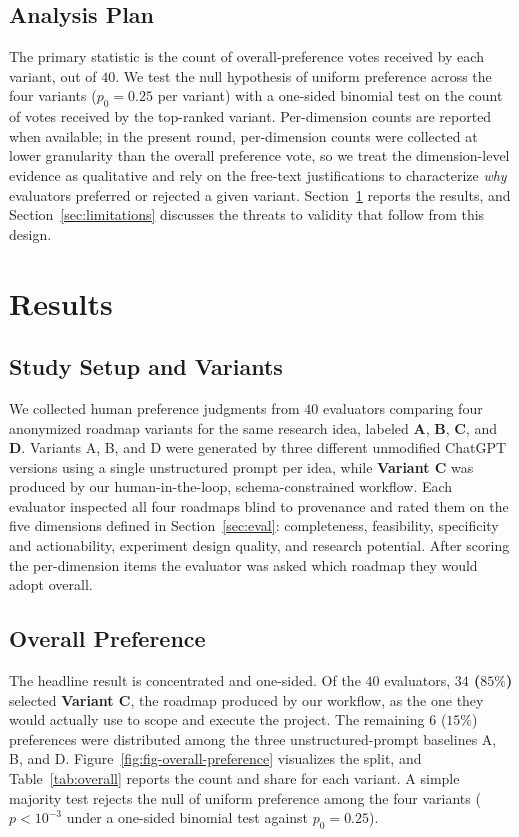 \documentclass{article}
\begin{document}
\subsection{Analysis Plan}
\label{sec:eval:analysis}

The primary statistic is the count of overall-preference votes received
by each variant, out of $40$. We test the null hypothesis of uniform
preference across the four variants ($p_0 = 0.25$ per variant) with a
one-sided binomial test on the count of votes received by the
top-ranked variant. Per-dimension counts are reported when available;
in the present round, per-dimension counts were collected at lower
granularity than the overall preference vote, so we treat the
dimension-level evidence as qualitative and rely on the free-text
justifications to characterize \emph{why} evaluators preferred or
rejected a given variant. Section~\ref{sec:results} reports the
results, and Section~\ref{sec:limitations} discusses the threats to
validity that follow from this design.

\section{Results}
\label{sec:results}

\subsection*{Study Setup and Variants}
We collected human preference judgments from $40$ evaluators comparing
four anonymized roadmap variants for the same research idea, labeled
\textbf{A}, \textbf{B}, \textbf{C}, and \textbf{D}. Variants A, B, and D
were generated by three different unmodified ChatGPT versions using a
single unstructured prompt per idea, while \textbf{Variant C} was
produced by our human-in-the-loop, schema-constrained workflow. Each
evaluator inspected all four roadmaps blind to provenance and rated
them on the five dimensions defined in Section~\ref{sec:eval}:
completeness, feasibility, specificity and actionability, experiment
design quality, and research potential. After scoring the per-dimension
items the evaluator was asked which roadmap they would adopt overall.

\subsection*{Overall Preference}
The headline result is concentrated and one-sided. Of the $40$
evaluators, \textbf{$34$ ($85\%$)} selected \textbf{Variant C}, the
roadmap produced by our workflow, as the one they would actually use to
scope and execute the project. The remaining $6$ ($15\%$) preferences
were distributed among the three unstructured-prompt baselines A, B,
and D. Figure~\ref{fig:fig-overall-preference} visualizes the split,
and Table~\ref{tab:overall} reports the count and share for each
variant. A simple majority test rejects the null of uniform preference
among the four variants ($p < 10^{-3}$ under a one-sided binomial test
against $p_0 = 0.25$).
\end{document}
